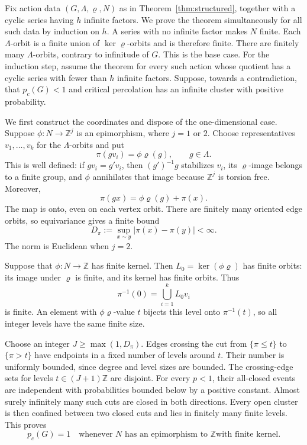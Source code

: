 \documentclass[11pt]{article}
\theoremstyle{definition}
\newcommand{\pc}{p_c}
\begin{document}
Fix action data \((G,\Lambda,\varrho,N)\) as in
Theorem~\ref{thm:structured}, together with a cyclic series having
\(h\) infinite factors. We prove the theorem simultaneously for all
such data by induction on \(h\). A series with no infinite factor
makes \(N\) finite. Each $\Lambda$-orbit is a finite union of
$\ker\varrho$-orbits and is therefore finite. There are finitely
many $\Lambda$-orbits, contrary to infinitude of $G$.
This is the base case. For the induction step, assume the theorem
for every such action whose quotient has a cyclic series with fewer
than \(h\) infinite factors. Suppose, towards a contradiction, that
\(\pc(G)<1\) and critical percolation has an infinite cluster with
positive probability.

We first construct the coordinates and dispose of the one-dimensional
case. Suppose $\phi:N\to\mathbb Z^j$ is an epimorphism, where $j=1$ or $2$.
Choose representatives $v_1,\ldots,v_k$ for the $\Lambda$-orbits and
put
\begin{equation}\label{eq:equivariant-projection}
 \pi(gv_i)=\phi\varrho(g),\qquad g\in\Lambda.
\end{equation}
This is well defined: if $gv_i=g'v_i$, then $(g')^{-1}g$ stabilizes
$v_i$, its $\varrho$-image belongs to a finite group, and $\phi$
annihilates that image because $\mathbb Z^j$ is torsion free. Moreover,
\begin{equation}\label{eq:projection-equivariance}
 \pi(gx)=\phi\varrho(g)+\pi(x).
\end{equation}
The map is onto, even on each vertex orbit. There are finitely many
oriented edge orbits, so equivariance gives a finite bound
\begin{equation}\label{eq:projection-edge-bound}
 D_\pi:=\sup_{x\sim y}|\pi(x)-\pi(y)|<\infty.
\end{equation}
The norm is Euclidean when $j=2$.

Suppose that $\phi:N\to\mathbb Z$ has finite kernel.
Then $L_0=\ker(\phi\varrho)$ has finite orbits: its image under
$\varrho$ is finite, and its kernel has finite orbits. Thus
\[
 \pi^{-1}(0)=\bigcup_{i=1}^k L_0v_i
\]
is finite. An element with $\phi\varrho$-value $t$ bijects this level
onto $\pi^{-1}(t)$, so all integer levels have the same finite size.

Choose an integer $J\ge\max(1,D_\pi)$. Edges crossing the cut from
$\{\pi\le t\}$ to $\{\pi>t\}$ have endpoints in a fixed number of
levels around $t$. Their number is uniformly bounded, since degree
and level sizes are bounded. The crossing-edge sets for levels
$t\in(J+1)\mathbb Z$ are disjoint. For every $p<1$, their all-closed
events are independent with probabilities bounded below by a positive
constant. Almost surely infinitely many such cuts are closed in both
directions. Every open cluster is then confined between two closed
cuts and lies in finitely many finite levels. This proves
\begin{equation}\label{eq:cyclic-critical-one}
 \pc(G)=1
 \quad\text{whenever $N$ has an epimorphism to $\mathbb Z$
 with finite kernel.}
\end{equation}
\end{document}
